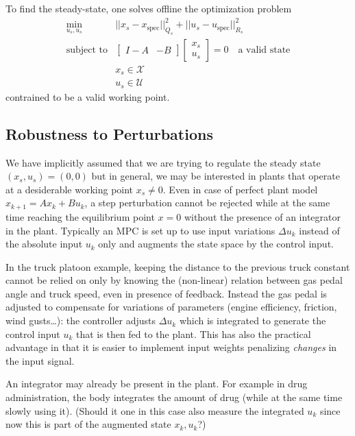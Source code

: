\documentclass[11pt]{report}
\begin{document}
To find the steady-state, one solves offline the optimization problem
\begin{align*}
  \min_{u_s,u_s} & ||x_s-x_\text{spec}||_{Q_s}^2 + ||u_s-u_\text{spec}||_{R_s}^2 \\
  \text{subject to} &
                      \begin{bmatrix}
                        I-A & -B
                      \end{bmatrix}
                      \begin{bmatrix}
                        x_s \\ u_s
                      \end{bmatrix} = 0\quad \text{a valid state} \\
  & x_s \in \mathcal{X} \\
  & u_s \in \mathcal{U}
\end{align*}
contrained to be a valid working point.

\subsection{Robustness to Perturbations}
\label{sec:robustness-to-perturbations}

We have implicitly assumed that we are trying to regulate the steady state $(x_s,u_s) = (0,0)$ but in general, we may be interested in plants that operate at a desiderable working point $x_s\neq 0$. Even in case of perfect plant model $x_{k+1} = Ax_k+Bu_k$, a step perturbation cannot be rejected while at the same time reaching the equilibrium point $x=0$ without the presence of an integrator in the plant. Typically an MPC is set up to use input variations $\Delta u_k$ instead of the absolute input $u_k$ only and augments the state space by the control input.

In the truck platoon example, keeping the distance to the previous truck constant cannot be relied on only by knowing the (non-linear) relation between gas pedal angle and truck speed, even in presence of feedback. Instead the gas pedal is adjusted to compensate for variations of parameters (engine efficiency, friction, wind gusts\ldots): the controller adjusts $\Delta u_k$ which is integrated to generate the control input $u_k$ that is then fed to the plant. This has also the practical advantage in that it is easier to implement input weights penalizing \emph{changes} in the input signal.

An integrator may already be present in the plant. For example in drug administration, the body integrates the amount of drug (while at the same time slowly using it). (Should it one in this case also measure the integrated $u_k$ since now this is part of the augmented state $x_k,u_k$?)
\end{document}
